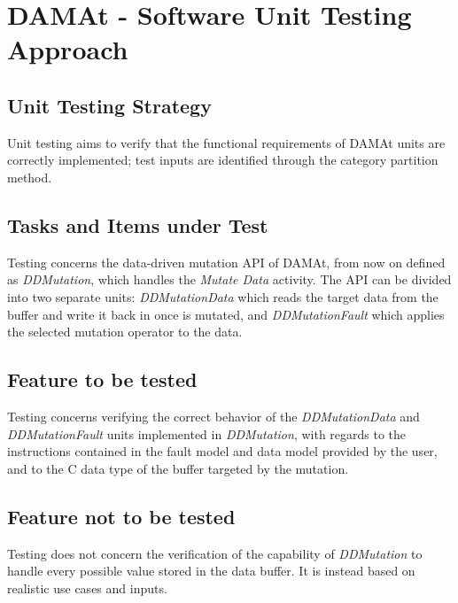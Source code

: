 
\chapter{DAMAt - Software Unit Testing Approach}
\label{chap:approach_DAMAt}


\section{Unit Testing Strategy}

Unit testing aims to verify that the functional requirements of DAMAt units are correctly implemented; test inputs are identified through the category partition method.


\section{Tasks and Items under Test}

Testing concerns the data-driven mutation API of DAMAt, from now on defined as \emph{DDMutation}, which handles the \emph{Mutate Data} activity.
The API can be divided into two separate units: \emph{DDMutationData} which reads the target data from the buffer and write it back in once is mutated, and \emph{DDMutationFault} which applies the selected mutation operator to the data.

\section{Feature to be tested}

Testing concerns verifying the correct behavior of the \emph{DDMutationData} and \emph{DDMutationFault} units implemented in \emph{DDMutation}, with regards to the instructions contained in the fault model and data model provided by the user, and to the C data type of the buffer targeted by the mutation.

\section{Feature not to be tested}

Testing does not concern the verification of the capability of \emph{DDMutation} to handle every possible value stored in the data buffer. It is instead based on realistic use cases and inputs.


